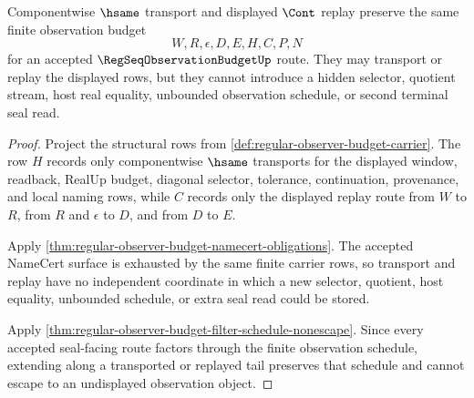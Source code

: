 \begin{theorem}\label{thm:regseq-observation-budget-tail-monotonicity}
Componentwise $\hsame$ transport and displayed $\Cont$ replay preserve the same finite observation budget
$$
W,R,\epsilon,D,E,H,C,P,N
$$
for an accepted $\RegSeqObservationBudgetUp$ route. They may transport or replay the displayed rows, but they cannot introduce a hidden selector, quotient stream, host real equality, unbounded observation schedule, or second terminal seal read.
\end{theorem}
\begin{proof}
Project the structural rows from \autoref{def:regular-observer-budget-carrier}. The row $H$ records only componentwise $\hsame$ transports for the displayed window, readback, RealUp budget, diagonal selector, tolerance, continuation, provenance, and local naming rows, while $C$ records only the displayed replay route from $W$ to $R$, from $R$ and $\epsilon$ to $D$, and from $D$ to $E$.

Apply \autoref{thm:regular-observer-budget-namecert-obligations}. The accepted NameCert surface is exhausted by the same finite carrier rows, so transport and replay have no independent coordinate in which a new selector, quotient, host equality, unbounded schedule, or extra seal read could be stored.

Apply \autoref{thm:regular-observer-budget-filter-schedule-nonescape}. Since every accepted seal-facing route factors through the finite observation schedule, extending along a transported or replayed tail preserves that schedule and cannot escape to an undisplayed observation object.
\end{proof}

